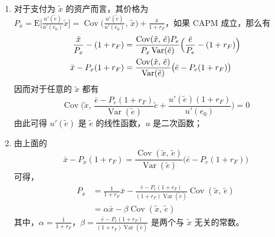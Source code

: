 \begin{solution}
\begin{enumerate}[label=(\alph*)]
    \item 对于支付为 $\tilde{x}$ 的资产而言，其价格为 $P_{x}=\mathrm{E}\bigl[\frac{u'(\tilde{e})}{u'(e_{0})}\tilde{x}\bigr]=\operatorname{Cov}\bigl(\frac{u'(\tilde{e})}{u'(e_{0})},\,\tilde{x}\bigr)+\frac{\bar{x}}{1+r_{F}}$，如果 CAPM 成立，那么有
    \[
        \begin{aligned}
            \frac{\bar{x}}{P_{x}}-(1+r_{F})&=\frac{\operatorname{Cov}(\tilde{x},\,\tilde{e})P_{e}}{P_{x}\operatorname{Var}(\tilde{e})}\Bigl(\frac{\bar{e}}{P_{e}}-(1+r_{F})\Bigr)\\
            \bar{x}-P_{x}(1+r_{F})&=\frac{\operatorname{Cov}(\tilde{x},\,\tilde{e})}{\operatorname{Var}(\tilde{e})}\bigl(\bar{e}-P_{e}(1+r_{F})\bigr)
        \end{aligned}
    \]
    因而对于任意的 $\tilde{x}$ 都有
    \[
        \operatorname{Cov}\Biggl(\tilde{x},\,\frac{\bar{e}-P_{e}(1+r_{F})}{\operatorname{Var}(\tilde{e})}\tilde{e}+\frac{u'(\tilde{e})(1+r_{F})}{u'(e_{0})}\Biggr)=0
    \]
    由此可得 $u'(\tilde{e})$ 是 $\tilde{e}$ 的线性函数，$u$ 是二次函数；

    \item 由上面的
    \[
        \bar{x}-P_{x}(1+r_{F})=\frac{\operatorname{Cov}(\tilde{x},\,\tilde{e})}{\operatorname{Var}(\tilde{e})}\bigl(\bar{e}-P_{e}(1+r_{F})\bigr)
    \]
    可得，
    \[
        \begin{aligned}
            P_{x}&=\frac{1}{1+r_{F}}\bar{x}-\frac{\bar{e}-P_{e}(1+r_{F})}{(1+r_{F})\operatorname{Var}(\tilde{e})}\operatorname{Cov}(\tilde{x},\,\tilde{e})\\
            &=\alpha\bar{x}-\beta\operatorname{Cov}(\tilde{x},\,\tilde{e})
        \end{aligned}
    \]
    其中，$\alpha=\frac{1}{1+r_{F}}$，$\beta=\frac{\bar{e}-P_{e}(1+r_{F})}{(1+r_{F})\operatorname{Var}(\tilde{e})}$ 是两个与 $\tilde{x}$ 无关的常数。
\end{enumerate}
\end{solution}

